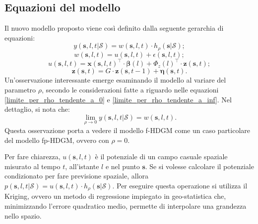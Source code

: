 \subsection[Equazioni del modello]{Equazioni del modello}
Il nuovo modello proposto viene così definito dalla seguente gerarchia di equazioni:
\begin{equation}
	y(\mathbf{s}, l, t| \mathcal{S}) = w(\mathbf{s}, l, t)\cdot h_\rho(\mathbf{s}|\mathcal{S});
	\label{eq_rumore_uscita_HDGM}
\end{equation}
\begin{equation}
	w(\mathbf{s}, l, t)= u(\mathbf{s}, l, t) + \epsilon(\mathbf{s}, l, t);
	\label{eq_rumore_uscita_fp_HDGM}
\end{equation}
\begin{equation}
	u(\mathbf{s}, l, t) = \mathbf{x}(\mathbf{s}, l, t)^\top\cdot\boldsymbol{\beta}(l) + \Phi_z(l)^\top\cdot\mathbf{z}(\mathbf{s}, t);
	\label{eq_comp_det_fp-HDGM}
\end{equation}
\begin{equation}
	\mathbf{z}(\mathbf{s}, t) = G\cdot \mathbf{z}(\mathbf{s}, t-1) + \boldsymbol{\eta}(\mathbf{s}, t).
	\label{eq_comp_lat_fp-HDGM}
\end{equation}
Un'osservazione interessante emerge esaminando il modello al variare del parametro $\rho$, secondo le considerazioni fatte a riguardo nelle equazioni \ref{limite_per_rho_tendente_a_0} e \ref{limite_per_rho_tendente_a_inf}. Nel dettaglio, si nota che:
\begin{equation}
	\lim_{\rho \to 0} y(\mathbf{s}, l, t| \mathcal{S}) = w(\mathbf{s}, l, t). \label{limite_geo-potenziale_condizionato_rho_a_0}
\end{equation}
Questa osservazione porta a vedere il modello f-HDGM come un caso particolare del modello fp-HDGM, ovvero con $\rho=0$.
\par Per fare chiarezza, $u(\mathbf{s}, l , t)$ è il potenziale di un campo casuale spaziale misurato al tempo $t$, all'istante $l$ e nel punto $\mathbf{s}$. Se si volesse calcolare il potenziale condizionato per fare previsione spaziale, allora $p(\mathbf{s}, l, t|\mathcal{S}) = u(\mathbf{s}, l , t)\cdot h_\rho(\mathbf{s}| \mathcal{S})$. Per eseguire questa operazione si utilizza il Kriging, ovvero un metodo di regressione impiegato in geo-statistica che, minimizzando l'errore quadratico medio, permette di interpolare una grandezza nello spazio.

